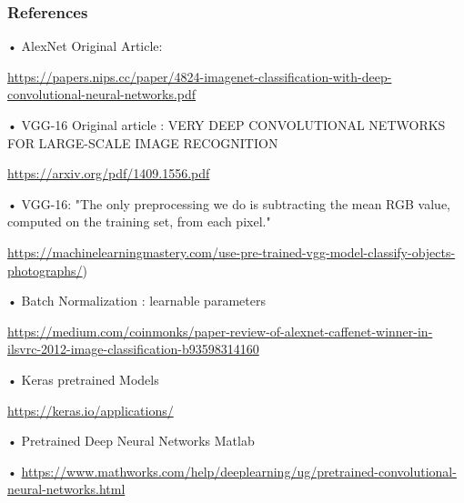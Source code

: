 \begin{frame}
\frametitle{References}
	
\begin{myitemize}
\item[•] AlexNet Original Article:
\item[] \url{https://papers.nips.cc/paper/4824-imagenet-classification-with-deep-convolutional-neural-networks.pdf}
\item[•] VGG-16 Original article : VERY DEEP CONVOLUTIONAL NETWORKS FOR LARGE-SCALE IMAGE RECOGNITION
\item[] \url{https://arxiv.org/pdf/1409.1556.pdf}
\item[•] VGG-16: "The only preprocessing we do is subtracting the mean RGB value, computed on the training set, from each pixel."
\item[] \url{https://machinelearningmastery.com/use-pre-trained-vgg-model-classify-objects-photographs/})
\item[•] Batch Normalization : learnable parameters
\item[] \url{https://medium.com/coinmonks/paper-review-of-alexnet-caffenet-winner-in-ilsvrc-2012-image-classification-b93598314160}
\item[•] Keras pretrained Models
\item[] \url{https://keras.io/applications/}
\item[•] Pretrained Deep Neural Networks Matlab
\item[•] \url{https://www.mathworks.com/help/deeplearning/ug/pretrained-convolutional-neural-networks.html}


\end{myitemize}
\end{frame}